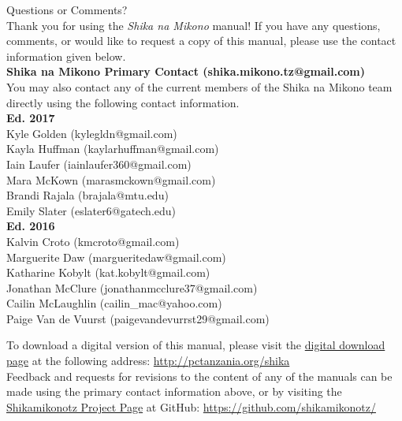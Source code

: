 \begin{center}
{\Huge Questions or Comments?}\\[12pt]
Thank you for using the \textit{Shika na Mikono} manual! If you have any questions, comments, or would like to request a copy of this manual, please use the contact information given below.\\[20pt]
\textbf{Shika na Mikono Primary Contact (shika.mikono.tz@gmail.com)}\\[20pt]
You may also contact any of the current members of the Shika na Mikono team directly using the following contact information.\\[18pt]
\textbf{Ed. 2017}\\
Kyle Golden (kylegldn@gmail.com)\\
Kayla Huffman (kaylarhuffman@gmail.com)\\
Iain Laufer (iainlaufer360@gmail.com)\\
Mara McKown (marasmckown@gmail.com)\\
Brandi Rajala (brajala@mtu.edu)\\
Emily Slater (eslater6@gatech.edu)\\
\vspace{12pt}
\textbf{Ed. 2016}\\
Kalvin Croto (kmcroto@gmail.com)\\
Marguerite Daw (margueritedaw@gmail.com)\\
Katharine Kobylt (kat.kobylt@gmail.com)\\
Jonathan McClure (jonathanmcclure37@gmail.com)\\
Cailin McLaughlin (cailin\_mac@yahoo.com)\\
Paige Van de Vuurst (paigevandevurrst29@gmail.com)\\

\end{center}
\vfill
To download a digital version of this manual, please visit the \href{http://pctanzania.org/shika}{digital download page} at the following address: \url{http://pctanzania.org/shika}\\

\noindent Feedback and requests for revisions to the content of any of the manuals can be made using the primary contact information above, or by visiting the \href{https://github.com/shikamikonotz/}{Shikamikonotz Project Page} at GitHub: \url{https://github.com/shikamikonotz/}